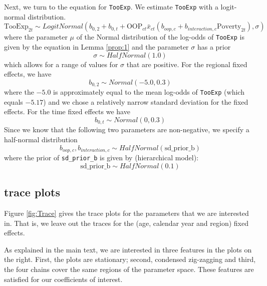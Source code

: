 \documentclass[a4paper,12pt]{article}
\begin{document}
Next, we turn to the equation for \texttt{TooExp}. We estimate \texttt{TooExp} with a logit-normal distribution.
\begin{equation}
\label{eq:TooExpDist}
\text{TooExp}_{2t} \sim LogitNormal(b_{0,2} + b_{0,t} + \text{OOP}_{ct} \bar{x}_{ct} \left(  b_{oop,c} + b_{interaction,c} \text{Poverty}_{2t} \right),\sigma)
\end{equation}
where the parameter \(\mu\) of the Normal distribution of the log-odds of \texttt{TooExp} is given by the equation in Lemma \ref{prop:1} and the parameter \(\sigma\) has a prior
\begin{equation}
\sigma \sim HalfNormal(1.0)
\end{equation}
which allows for a range of values for \(\sigma\) that are positive.
For the regional fixed effects, we have
\begin{equation}
b_{0,2} \sim Normal(-5.0,0.3)
\end{equation}
where the \(-5.0\) is approximately equal to the mean log-odds of \texttt{TooExp} (which equals \(-5.17\)) and we chose a relatively narrow standard deviation for the fixed effects. For the time fixed effects we have
\begin{equation}
b_{0,t} \sim Normal(0,0.3)
\end{equation}
Since we know that the following two parameters are non-negative, we specify a half-normal distribution
\begin{equation}
b_{oop,c},b_{interaction,c} \sim HalfNormal(\text{sd\_prior\_b})
\end{equation}
where the prior of \texttt{sd\_prior\_b} is given by (hierarchical model):
\begin{equation}
\text{sd\_prior\_b} \sim HalfNormal(0.1)
\end{equation}


\subsection{trace plots}
\label{sec:org7ccb898}

Figure \ref{fig:Trace} gives the trace plots for the parameters that we are interested in. That is, we leave out the traces for the (age, calendar year and region) fixed effects.

As explained in the main text, we are interested in three features in the plots on the right. First, the plots are stationary; second, condensed zig-zagging and third, the four chains cover the same regions of the parameter space. These features are satisfied for our coefficients of interest.
\end{document}
